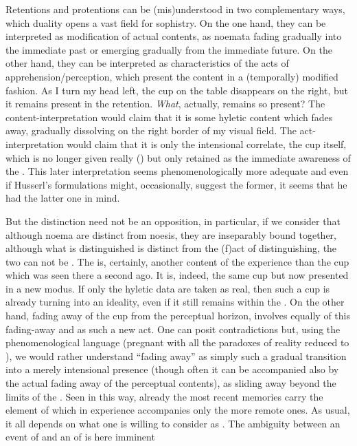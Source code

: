 Retentions and protentions can be (mis)understood in two complementary ways,
which duality opens a vast field for sophistry. On the one hand, they can be
interpreted as modification of actual contents, as noemata fading gradually into
the immediate past or emerging gradually from the immediate future. On the other
hand, they can be interpreted as characteristics of the acts of
apprehension/perception, which present the content in a (temporally) modified
fashion. As I turn my head left, the cup on the table disappears on the right,
but it remains present in the retention. {\em What}, actually, remains so
present? The content-interpretation would claim that it is some hyletic content
which fades away, gradually dissolving on the right border of my visual
field. The act-interpretation would claim that it is only the intensional
correlate, the cup itself, which is no longer given really () but
only retained as the immediate awareness of the . This later interpretation seems phenomenologically more adequate and
even if Husserl's formulations might, occasionally, suggest the former, 
it seems that he had the latter one in mind.

But the distinction need not be an opposition, in particular, if we consider
that although noema are distinct from noesis, they are inseparably bound
together, although what is distinguished is distinct from the (f)act of
distinguishing, the two can not be . The  is, certainly, another content of the 
experience than the cup which was seen there a second ago. It is, indeed, the
same cup but now presented in a new modus. If only the  hyletic
data are taken as real, then such a cup is already turning into an ideality,
even if it still remains within the . On the
other hand, fading away of the cup from the perceptual horizon, involves equally
 of this fading-away and as such a new act. One can posit
contradictions but, using the phenomenological language  (pregnant with all the
paradoxes of reality reduced to ), we would rather
understand ``fading away'' as simply such a gradual transition into a merely
intensional presence (though often it can be accompanied also by the actual
fading away of the perceptual contents), as sliding away beyond the limits of
the . Seen in this way, already the most recent
memories carry the element of  which in experience accompanies
only the more remote ones.
%
As usual, it all depends on what one is willing to consider as .
The ambiguity between an event of  and an  of
 is here imminent